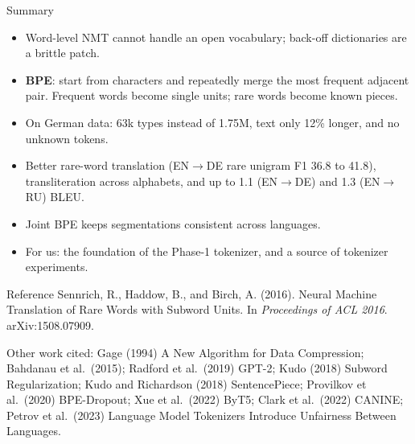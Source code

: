\documentclass[aspectratio=169,11pt]{beamer}
\begin{document}
\begin{frame}{Summary}
  \begin{itemize}
    \item Word-level NMT cannot handle an open vocabulary; back-off dictionaries are a brittle patch.
    \item \textbf{BPE}: start from characters and repeatedly merge the most frequent adjacent pair. Frequent words become single units; rare words become known pieces.
    \item On German data: 63k types instead of 1.75M, text only 12\% longer, and no unknown tokens.
    \item Better rare-word translation (EN$\to$DE rare unigram F1 36.8 to 41.8), transliteration across alphabets, and up to 1.1 (EN$\to$DE) and 1.3 (EN$\to$RU) BLEU.
    \item Joint BPE keeps segmentations consistent across languages.
    \item For us: the foundation of the Phase-1 tokenizer, and a source of tokenizer experiments.
  \end{itemize}
\end{frame}

\begin{frame}{Reference}
  \small
  Sennrich, R., Haddow, B., and Birch, A. (2016). Neural Machine Translation of Rare Words with Subword Units. In \emph{Proceedings of ACL 2016}. arXiv:1508.07909.
  \vspace{3mm}

  {\footnotesize Other work cited: Gage (1994) A New Algorithm for Data Compression; Bahdanau et al.\ (2015); Radford et al.\ (2019) GPT-2; Kudo (2018) Subword Regularization; Kudo and Richardson (2018) SentencePiece; Provilkov et al.\ (2020) BPE-Dropout; Xue et al.\ (2022) ByT5; Clark et al.\ (2022) CANINE; Petrov et al.\ (2023) Language Model Tokenizers Introduce Unfairness Between Languages.}
\end{frame}
\end{document}
